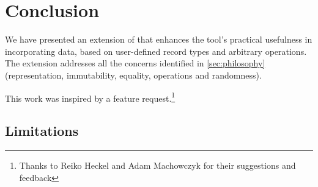 \section{Conclusion}
\label{sec:concl}

We have presented an extension of \GROOVE that enhances the tool's practical usefulness in incorporating data, based on user-defined record types and arbitrary operations. The extension addresses all the concerns identified in \cref{sec:philosophy} (representation, immutability, equality, operations and randomness).

This work was inspired by a feature request.\footnote{Thanks to Reiko Heckel and Adam Machowczyk for their suggestions and feedback}

\subsection{Limitations}
\label{sec:limitations}


